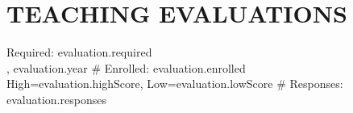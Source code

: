 \section{TEACHING EVALUATIONS}

 \hfill Required: {{evaluation.required}} \\
, {{evaluation.year}} \hfill \# Enrolled: {{evaluation.enrolled}}\\
High={{evaluation.highScore}}, Low={{evaluation.lowScore}} \hfill \# Responses: {{evaluation.responses}}
\nopagebreak[4]
